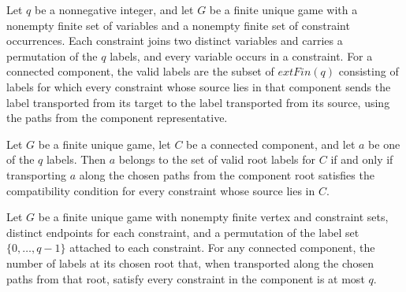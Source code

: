 \begin{definition}
\label{FABL.FiniteUniqueGame.validComponentRootLabels}
\leanok
{}
Let $q$ be a nonnegative integer, and let $G$ be a finite unique game with a nonempty
finite set of variables and a nonempty finite set of constraint occurrences. Each
constraint joins two distinct variables and carries a permutation of the $q$ labels, and
every variable occurs in a constraint. For a connected component, the valid labels are
the subset of $	ext{Fin}(q)$ consisting of labels for which every constraint whose
source lies in that component sends the label transported from its target to the label
transported from its source, using the paths from the component representative.
\end{definition}

\begin{theorem}
\label{FABL.FiniteUniqueGame.mem_validComponentRootLabels}
\leanok
{}
Let $G$ be a finite unique game, let $C$ be a connected component, and let $a$ be one of
the $q$ labels. Then $a$ belongs to the set of valid root labels for $C$ if and only if
transporting $a$ along the chosen paths from the component root satisfies the
compatibility condition for every constraint whose source lies in $C$.
\end{theorem}

\begin{theorem}
\label{FABL.FiniteUniqueGame.card_validComponentRootLabels_le}
\leanok
{}
Let $G$ be a finite unique game with nonempty finite vertex and constraint sets,
distinct endpoints for each constraint, and a permutation of the label set
$\{0,\ldots,q-1\}$ attached to each constraint. For any connected component, the
number of labels at its chosen root that, when transported along the chosen paths from
that root, satisfy every constraint in the component is at most $q$.
\end{theorem}

